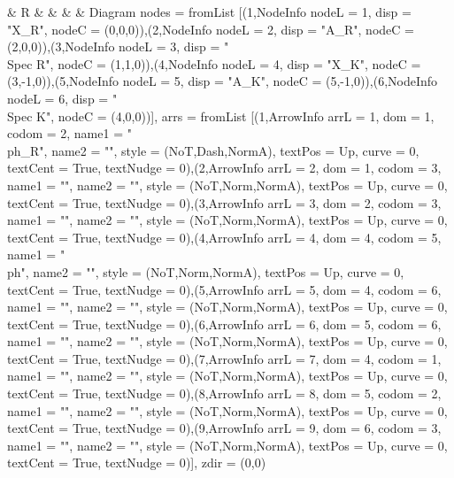 { & \Spec R &  &  &  & }Diagram {nodes = fromList [(1,NodeInfo {nodeL = 1, disp = "X_R", nodeC = (0,0,0)}),(2,NodeInfo {nodeL = 2, disp = "A_R", nodeC = (2,0,0)}),(3,NodeInfo {nodeL = 3, disp = "\\Spec R", nodeC = (1,1,0)}),(4,NodeInfo {nodeL = 4, disp = "X_K", nodeC = (3,-1,0)}),(5,NodeInfo {nodeL = 5, disp = "A_K", nodeC = (5,-1,0)}),(6,NodeInfo {nodeL = 6, disp = "\\Spec K", nodeC = (4,0,0)})], arrs = fromList [(1,ArrowInfo {arrL = 1, dom = 1, codom = 2, name1 = "\\ph_R", name2 = "", style = (NoT,Dash,NormA), textPos = Up, curve = 0, textCent = True, textNudge = 0}),(2,ArrowInfo {arrL = 2, dom = 1, codom = 3, name1 = "", name2 = "", style = (NoT,Norm,NormA), textPos = Up, curve = 0, textCent = True, textNudge = 0}),(3,ArrowInfo {arrL = 3, dom = 2, codom = 3, name1 = "", name2 = "", style = (NoT,Norm,NormA), textPos = Up, curve = 0, textCent = True, textNudge = 0}),(4,ArrowInfo {arrL = 4, dom = 4, codom = 5, name1 = "\\ph", name2 = "", style = (NoT,Norm,NormA), textPos = Up, curve = 0, textCent = True, textNudge = 0}),(5,ArrowInfo {arrL = 5, dom = 4, codom = 6, name1 = "", name2 = "", style = (NoT,Norm,NormA), textPos = Up, curve = 0, textCent = True, textNudge = 0}),(6,ArrowInfo {arrL = 6, dom = 5, codom = 6, name1 = "", name2 = "", style = (NoT,Norm,NormA), textPos = Up, curve = 0, textCent = True, textNudge = 0}),(7,ArrowInfo {arrL = 7, dom = 4, codom = 1, name1 = "", name2 = "", style = (NoT,Norm,NormA), textPos = Up, curve = 0, textCent = True, textNudge = 0}),(8,ArrowInfo {arrL = 8, dom = 5, codom = 2, name1 = "", name2 = "", style = (NoT,Norm,NormA), textPos = Up, curve = 0, textCent = True, textNudge = 0}),(9,ArrowInfo {arrL = 9, dom = 6, codom = 3, name1 = "", name2 = "", style = (NoT,Norm,NormA), textPos = Up, curve = 0, textCent = True, textNudge = 0})], zdir = (0,0)}
